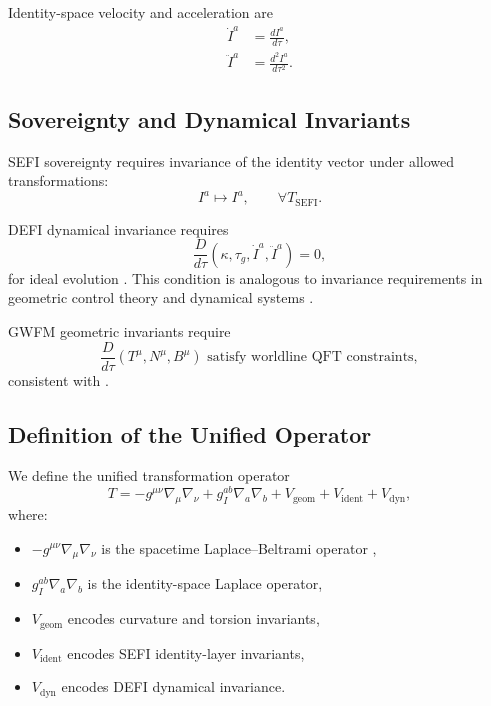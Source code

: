 \documentclass[aip,jmp,reprint,onecolumn,nofootinbib]{revtex4-2}
\begin{document}
Identity-space velocity and acceleration are
\begin{align}
\dot{I}^a &= \frac{dI^a}{d\tau}, \\
\ddot{I}^a &= \frac{d^2 I^a}{d\tau^2}.
\end{align}

\subsection{Sovereignty and Dynamical Invariants}

SEFI sovereignty requires invariance of the identity vector under allowed transformations:
\begin{equation}
I^a \mapsto I^a, \qquad \forall T_{\mathrm{SEFI}}.
\end{equation}

DEFI dynamical invariance requires
\begin{equation}
\frac{D}{d\tau}
\left(
\kappa, \tau_g, \dot{I}^a, \ddot{I}^a
\right)
= 0,
\end{equation}
for ideal evolution \cite{DuttonDEFI2026}. This condition is analogous to invariance 
requirements in geometric control theory and dynamical systems \cite{MarsdenWest}.

GWFM geometric invariants require
\begin{equation}
\frac{D}{d\tau}
\left(
T^\mu, N^\mu, B^\mu
\right)
\text{ satisfy worldline QFT constraints},
\end{equation}
consistent with \cite{Polyakov1987,Strassler1992,Schubert2001}.

\subsection{Definition of the Unified Operator}

We define the unified transformation operator
\begin{equation}
T = 
- g^{\mu\nu}\nabla_\mu\nabla_\nu
+ g_I^{ab}\nabla_a\nabla_b
+ V_{\mathrm{geom}}
+ V_{\mathrm{ident}}
+ V_{\mathrm{dyn}},
\end{equation}
where:

\begin{itemize}
\item $-g^{\mu\nu}\nabla_\mu\nabla_\nu$ is the spacetime Laplace--Beltrami operator 
\cite{RosenbergLaplace},
\item $g_I^{ab}\nabla_a\nabla_b$ is the identity-space Laplace operator,
\item $V_{\mathrm{geom}}$ encodes curvature and torsion invariants,
\item $V_{\mathrm{ident}}$ encodes SEFI identity-layer invariants,
\item $V_{\mathrm{dyn}}$ encodes DEFI dynamical invariance.
\end{itemize}
\end{document}
